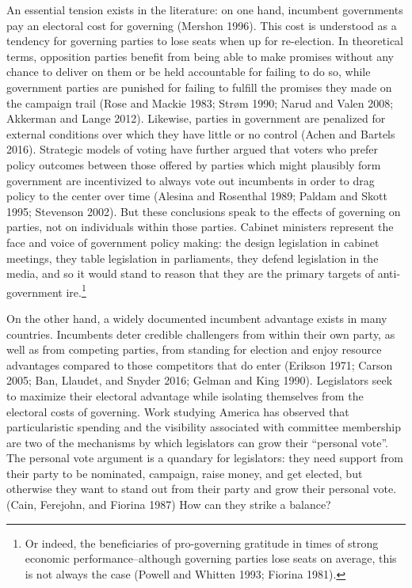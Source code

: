 \documentclass[letter,12pt]{article}
\begin{document}
An essential tension exists in the literature: on one hand, incumbent governments pay an electoral cost for governing (Mershon 1996). This cost is understood as a tendency for governing parties to lose seats when up for re-election. In theoretical terms, opposition parties benefit from being able to make promises without any chance to deliver on them or be held accountable for failing to do so, while government parties are punished for failing to fulfill the promises they made on the campaign trail (Rose and Mackie 1983; Str{\o}m 1990; Narud and Valen 2008; Akkerman and Lange 2012). Likewise, parties in government are penalized for external conditions over which they have little or no control (Achen and Bartels 2016). Strategic models of voting have further argued that voters who prefer policy outcomes between those offered by parties which might plausibly form government are incentivized to always vote out incumbents in order to drag policy to the center over time (Alesina and Rosenthal 1989; Paldam and Skott 1995; Stevenson 2002). But these conclusions speak to the effects of governing on parties, not on individuals within those parties. Cabinet ministers represent the face and voice of government policy making: the design legislation in cabinet meetings, they table legislation in parliaments, they defend legislation in the media, and so it would stand to reason that they are the primary targets of anti-government ire.\footnote{Or indeed, the beneficiaries of pro-governing gratitude in times of strong economic performance--although governing parties lose seats on average, this is not always the case (Powell and Whitten 1993; Fiorina 1981).}

On the other hand, a widely documented incumbent advantage exists in many countries. Incumbents deter credible challengers from within their own party, as well as from competing parties, from standing for election and enjoy resource advantages compared to those competitors that do enter (Erikson 1971; Carson 2005; Ban, Llaudet, and Snyder 2016; Gelman and King 1990). Legislators seek to maximize their electoral advantage while isolating themselves from the electoral costs of governing. Work studying America has observed that particularistic spending and the visibility associated with committee membership are two of the mechanisms by which legislators can grow their ``personal vote''. The personal vote argument is a quandary for legislators: they need support from their party to be nominated, campaign, raise money, and get elected, but otherwise they want to stand out from their party and grow their personal vote. (Cain, Ferejohn, and Fiorina 1987) How can they strike a balance?
\end{document}
